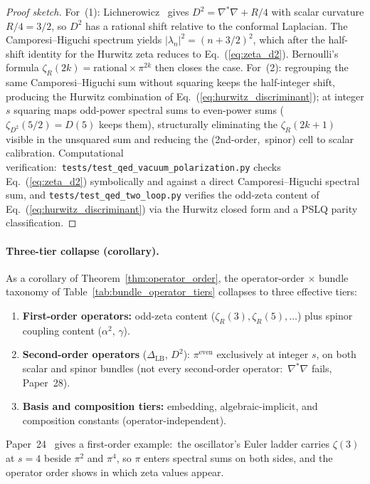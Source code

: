 \documentclass[aps,pra,twocolumn,superscriptaddress,longbibliography]{revtex4-2}
\begin{document}
\begin{proof}[Proof sketch]
For~(1): Lichnerowicz~\cite{lichnerowicz1963} gives $D^2 = \nabla^*
\nabla + R/4$ with scalar curvature $R/4 = 3/2$, so $D^2$ has a
rational shift relative to the conformal Laplacian.  The
Camporesi--Higuchi spectrum yields $|\lambda_n|^2 = (n+3/2)^2$,
which after the half-shift identity for the Hurwitz zeta reduces to
Eq.~(\ref{eq:zeta_d2}).  Bernoulli's formula $\zeta_R(2k) =
\mathrm{rational} \times \pi^{2k}$ then closes the case.  For~(2):
regrouping the same Camporesi--Higuchi sum without squaring keeps the
half-integer shift, producing the Hurwitz combination of
Eq.~(\ref{eq:hurwitz_discriminant}); at integer $s$ squaring maps
odd-power spectral sums to even-power sums ($\zeta_{D^2}(5/2) = D(5)$
keeps them), structurally eliminating the $\zeta_R(2k{+}1)$
visible in the unsquared sum and reducing the (2nd-order,~spinor) cell
to scalar calibration.  Computational verification:\ \texttt{tests/test\_qed\_vacuum\_polarization.py}
checks Eq.~(\ref{eq:zeta_d2}) symbolically and against a direct
Camporesi--Higuchi spectral sum, and \texttt{tests/test\_qed\_two\_loop.py}
verifies the odd-zeta content of Eq.~(\ref{eq:hurwitz_discriminant}) via
the Hurwitz closed form and a PSLQ parity classification.
\end{proof}

\paragraph{Three-tier collapse (corollary).}
As a corollary of Theorem~\ref{thm:operator_order}, the
operator-order $\times$ bundle taxonomy of
Table~\ref{tab:bundle_operator_tiers} collapses to three effective
tiers:
\begin{enumerate}
  \item \textbf{First-order operators:} odd-zeta content
    ($\zeta_R(3), \zeta_R(5), \ldots$) plus spinor coupling content
    ($\alpha^2$, $\gamma$).
  \item \textbf{Second-order operators} ($\Delta_{\mathrm{LB}}$, $D^2$):
    $\pi^{\text{even}}$ exclusively at integer $s$, on both scalar and
    spinor bundles (not every second-order operator:\ $\nabla^*\nabla$
    fails, Paper~28).
  \item \textbf{Basis and composition tiers:} embedding,
    algebraic-implicit, and composition constants
    (operator-independent).
\end{enumerate}
Paper~24~\cite{loutey_paper24} gives a first-order example:\ the
oscillator's Euler ladder carries $\zeta(3)$ at $s = 4$ beside $\pi^2$
and $\pi^4$, so $\pi$ enters spectral sums on both sides, and the
operator order shows in which zeta values appear.
\end{document}

